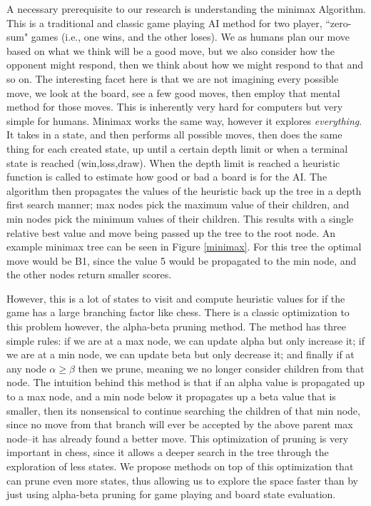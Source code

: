 \documentclass[letterpaper]{article}
\begin{document}
A necessary prerequisite to our research is understanding the minimax Algorithm. This is a traditional and classic game playing AI method for two player, ``zero-sum" games (i.e., one wins, and the other loses). We as humans plan our move based on what we think will be a good move, but we also consider how the opponent might respond, then we think about how we might respond to that and so on. The interesting facet here is that we are not imagining every possible move, we look at the board, see a few good moves, then employ that mental method for those moves. This is inherently very hard for computers but very simple for humans.  Minimax works the same way, however it explores \textit{everything}. It takes in a state, and then performs all possible moves, then does the same thing for each created state, up until a certain depth limit or when a terminal state is reached (win,loss,draw). When the depth limit is reached a heuristic function is called to estimate how good or bad a board is for the AI.  The algorithm then propagates the values of the heuristic back up the tree in a depth first search manner; max nodes pick the maximum value of their children, and min nodes pick the minimum values of their children. This results with a single relative best value and move being passed up the tree to the root node. An example minimax tree can be seen in Figure \ref{minimax}. For this tree the optimal move would be B1, since the value 5 would be propagated to the min node, and the other nodes return smaller scores.

However, this is a lot of states to visit and compute heuristic values for if the game has a large branching factor like chess. There is a classic optimization to this problem however, the alpha-beta pruning method. The method has three simple rules: if we are at a max node, we can update alpha but only increase it; if we are at a min node, we can update beta but only decrease it; and finally if at any node $\alpha \geq \beta$ then we prune, meaning we no longer consider children from that node. The intuition behind this method is that if an alpha value is propagated up to a max node, and a min node below it propagates up a beta value that is smaller, then its nonsensical to continue searching the children of that min node, since no move from that branch will ever be accepted by the above parent max node--it has already found a better move. This optimization of pruning is very important in chess, since it allows a deeper search in the tree through the exploration of less states. We propose methods on top of this optimization that can prune even more states, thus allowing us to explore the space faster than by just using alpha-beta pruning for game playing and board state evaluation. 
\end{document}
